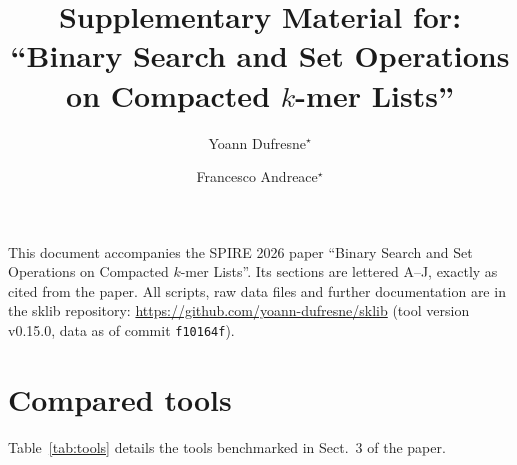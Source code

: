 \documentclass[runningheads,a4paper]{llncs}
\newcommand{\sklib}{\textsf{sklib}\xspace}
\begin{document}
\title{Supplementary Material for:\\ ``Binary Search and Set Operations on Compacted $k$-mer Lists''}

\author{Yoann Dufresne$^{\star}$\and
Francesco Andreace$^{\star}$}


\maketitle
{\renewcommand{\thefootnote}{}}

\noindent This document accompanies the SPIRE 2026 paper ``Binary Search and Set Operations on Compacted $k$-mer Lists''. Its sections are lettered A--J, exactly as cited from the paper. All scripts, raw data files and further documentation are in the \sklib{} repository: \url{https://github.com/yoann-dufresne/sklib} (tool version v0.15.0, data as of commit \texttt{f10164f}).

\appendix

\section{Compared tools}
\label{app:tools}
Table~\ref{tab:tools} details the tools benchmarked in Sect.~3 of the paper.
\end{document}
